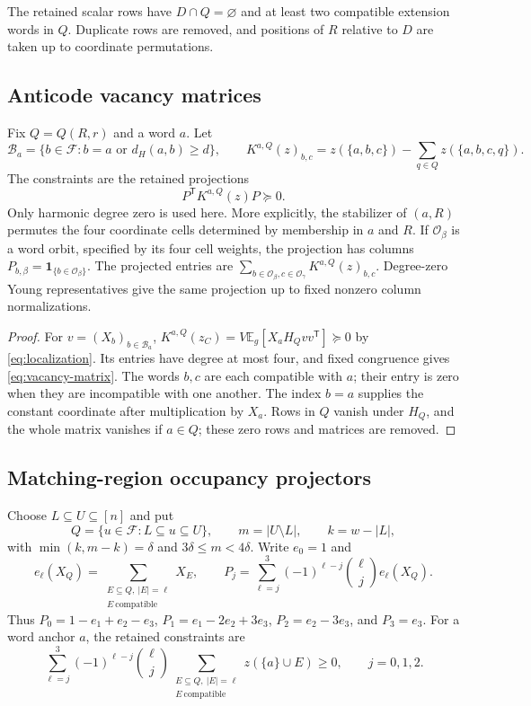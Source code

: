 \documentclass[11pt]{article}
\newcommand{\F}{\mathcal F}
\newcommand{\E}{\mathbb E}
\newcommand{\ind}{\mathbf 1}
\newcommand{\comp}{\text{compatible}}
\begin{document}
The retained scalar rows have $D\cap Q=\varnothing$ and at least two
compatible extension words in $Q$. Duplicate rows are removed, and positions
of $R$ relative to $D$ are taken up to coordinate permutations.

\subsection{Anticode vacancy matrices}\label{subsec:vacancy-matrix}

Fix $Q=Q(R,r)$ and a word $a$. Let
\[
 \mathcal B_a=\{b\in\F:b=a\text{ or }d_H(a,b)\ge d\},\qquad
 K^{a,Q}(z)_{b,c}=z(\{a,b,c\})-\sum_{q\in Q}z(\{a,b,c,q\}).
\]
The constraints are the retained projections
\begin{equation}\label{eq:vacancy-matrix}
 P^{\mathsf T}K^{a,Q}(z)P\succeq0.
\end{equation}
Only harmonic degree zero is used here. More explicitly, the stabilizer of
$(a,R)$ permutes the four coordinate cells determined by membership in $a$
and $R$. If $\mathcal O_\beta$ is a word orbit, specified by its four cell
weights, the projection has columns
$P_{b,\beta}=\ind_{\{b\in\mathcal O_\beta\}}$. The projected entries are
$\sum_{b\in\mathcal O_\beta,c\in\mathcal O_\gamma}K^{a,Q}(z)_{b,c}$.
Degree-zero Young representatives give the same projection up to fixed
nonzero column normalizations.

\begin{proof}
For $v=(X_b)_{b\in\mathcal B_a}$,
$K^{a,Q}(z_C)=V\E_g[X_aH_Qvv^{\mathsf T}]\succeq0$ by
\eqref{eq:localization}. Its entries have degree at most four, and fixed
congruence gives \eqref{eq:vacancy-matrix}. The words $b,c$ are each compatible
with $a$; their entry is zero when they are incompatible with one another.
The index $b=a$ supplies the constant coordinate after multiplication by
$X_a$. Rows in $Q$ vanish under $H_Q$, and the whole matrix vanishes if
$a\in Q$; these zero rows and matrices are removed.
\end{proof}

\subsection{Matching-region occupancy projectors}\label{subsec:matching}

Choose $L\subseteq U\subseteq[n]$ and put
\[
 Q=\{u\in\F:L\subseteq u\subseteq U\},\qquad
 m=|U\setminus L|,\qquad k=w-|L|,
\]
with $\min(k,m-k)=\delta$ and $3\delta\le m<4\delta$.
Write $e_0=1$ and
\[
 e_\ell(X_Q)=\sum_{\substack{E\subseteq Q,\ |E|=\ell\\E\ \comp}}X_E,
 \qquad
 P_j=\sum_{\ell=j}^3(-1)^{\ell-j}\binom\ell j e_\ell(X_Q).
\]
Thus $P_0=1-e_1+e_2-e_3$, $P_1=e_1-2e_2+3e_3$,
$P_2=e_2-3e_3$, and $P_3=e_3$. For a word anchor $a$, the retained
constraints are
\begin{equation}\label{eq:matching}
 \sum_{\ell=j}^3(-1)^{\ell-j}\binom\ell j
 \sum_{\substack{E\subseteq Q,\ |E|=\ell\\E\ \comp}}
 z(\{a\}\cup E)\ge0,\qquad j=0,1,2.
\end{equation}
\end{document}
